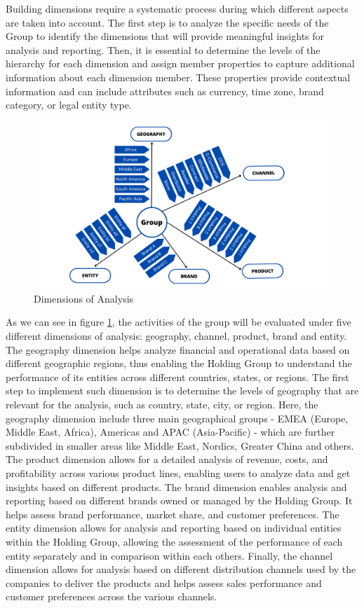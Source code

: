 \documentclass[12pt,a4paper,openright,twoside]{book}
\begin{document}
Building dimensions require a systematic process during which different aspects are taken into account.
%
The first step is to analyze the specific needs of the Group to identify the dimensions that will provide meaningful insights for analysis and reporting.
%
Then, it is essential to determine the levels of the hierarchy for each dimension and assign member properties to capture additional information about each dimension member. 
%
These properties provide contextual information and can include attributes such as currency, time zone, brand category, or legal entity type. \\

\begin{figure}[htbp]
	\centering
	\includegraphics[width=\linewidth]{figures/dimensions.pdf}
	\caption{Dimensions of Analysis}
	\label{fig:dimensions}
\end{figure}

As we can see in figure \ref{fig:dimensions}, the activities of the group will be evaluated under five different dimensions of analysis: geography, channel, product, brand and entity.
%
The geography dimension helps analyze financial and operational data based on different geographic regions, thus enabling the Holding Group to understand the performance of its entities across different countries, states, or regions. 
%
The first step to implement such dimension is to determine the levels of geography that are relevant for the analysis, such as country, state, city, or region.
%
Here, the geography dimension include three main geographical groups - EMEA (Europe, Middle East, Africa), Americas and APAC (Asia-Pacific) - which are further subdivided in smaller areas like Middle East, Nordics, Greater China and others.
%
The product dimension allows for a detailed analysis of revenue, costs, and profitability across various product lines, enabling users to analyze data and get insights based on different products.
%
The brand dimension enables analysis and reporting based on different brands owned or managed by the Holding Group. It helps assess brand performance, market share, and customer preferences.
%
The entity dimension allows for analysis and reporting based on individual entities within the Holding Group, allowing the assessment of the performance of each entity separately and in comparison within each others.
%
Finally, the channel dimension allows for analysis based on different distribution channels used by the companies to deliver the products and helps assess sales performance and customer preferences across the various channels. 
\end{document}
